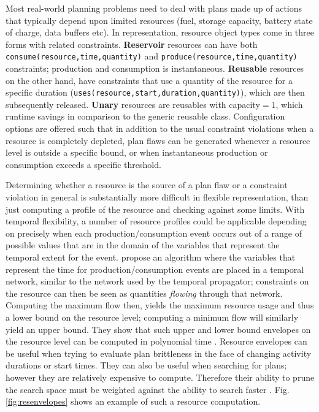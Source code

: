 Most real-world planning problems need to deal with plans made up of
actions that typically depend upon limited resources (\eg fuel,
storage capacity, battery state of charge, data buffers etc).  %
In \eus representation, resource object types come in three forms with
related constraints. \textbf{Reservoir} resources can have both
\texttt{consume(resource,time,quantity)} and
\texttt{produce(resource,time,quantity)} constraints; production and
consumption is instantaneous. \textbf{Reusable} resources on the other
hand, have constraints that use a quantity of the resource for a
specific duration (\texttt{uses(resource,start,duration,quantity)}),
which are then subsequently released. \textbf {Unary} resources are
reusables with capacity$=1$, which  runtime
savings in comparison to the generic reusable class. Configuration
options are offered such that in addition to the usual constraint
violations when a resource is completely depleted, plan flaws can be
generated whenever a resource level is outside a specific bound, or
when instantaneous production or consumption exceeds a specific
threshold.

Determining whether a resource is the source of a plan flaw or a
constraint violation in general is substantially more difficult in
\eus flexible representation, than just computing a profile of the
resource and checking against some limits.  With temporal flexibility,
a number of resource profiles could be applicable depending on
precisely when each production/consumption event occurs out of a range
of possible values that are in the domain of the variables that
represent the temporal extent for the event.
\cite{Muscettola04,Muscettola06} propose an algorithm where the
variables that represent the time for production/consumption events
are placed in a temporal network, similar to the network used by the
temporal propagator; constraints on the resource can then be seen as
quantities \emph{flowing} through that network. Computing the maximum
flow then, yields the maximum resource usage and thus a lower bound on
the resource level; computing a minimum flow will similarly yield an
upper bound. They show that such upper and lower bound envelopes on
the resource level can be computed in polynomial time
\cite{corman}. Resource envelopes can be useful when trying to
evaluate plan brittleness in the face of changing activity durations
or start times. They can also be useful when searching for plans;
however they are relatively expensive to compute. Therefore their
ability to prune the search space must be weighted against the ability
to search faster \cite{6007772, morris11}. Fig. \ref{fig:resenvelopes}
shows an example of such a resource computation.

